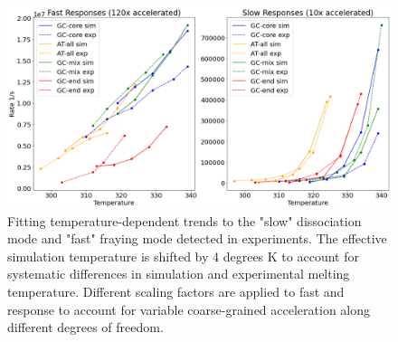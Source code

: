 \documentclass[journal=jpcbfk,manuscript=article]{achemso}
\begin{document}
\begin{figure}  %
	\begin{center}
        \includegraphics[width=\textwidth]{Figs/figs_imp/Tjump_responses.png}
        \caption{Fitting temperature-dependent trends to the "slow" dissociation mode and "fast" fraying mode detected in experiments. The effective simulation temperature is shifted by 4 degrees K to account for systematic differences in simulation and experimental melting temperature. Different scaling factors are applied to fast and response to account for variable coarse-grained acceleration along different degrees of freedom.}
        \label{fig:relaxation-comparison}
	\end{center}
\end{figure}

\end{document}
